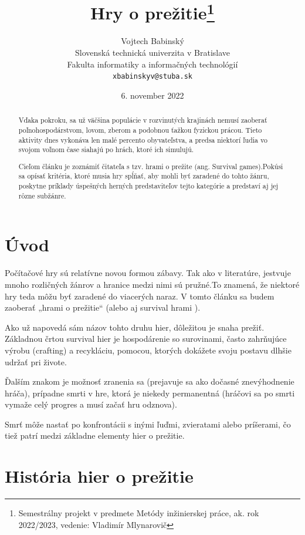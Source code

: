 \documentclass[10pt,oneoside,slovak,a4paper]{article}
\title{Hry o prežitie\thanks{Semestrálny projekt v predmete Metódy inžinierskej práce, ak. rok 2022/2023, vedenie: Vladimír Mlynarovič}} %
\author{Vojtech Babinský\\[2pt]
	{\small Slovenská technická univerzita v Bratislave}\\
	{\small Fakulta informatiky a informačných technológií}\\
	{\small \texttt{xbabinskyv@stuba.sk}}
	}
\date{\small 6. november 2022} %
\begin{document}
\maketitle

\begin{abstract}

Vďaka pokroku, sa už väčšina populácie v rozvinutých krajinách nemusí zaoberať poľnohospodárstvom, lovom, zberom a podobnou ťažkou fyzickou prácou. Tieto aktivity dnes vykonáva len malé percento obyvateľstva, a predsa niektorí ľudia vo svojom voľnom čase siahajú po hrách, ktoré ich simulujú.

Cieľom článku je zoznámiť čitateľa s tzv. hrami o prežite (ang. Survival games).Pokúsi sa opísať kritéria, ktoré musia hry spĺňať, aby mohli byť zaradené do tohto žánru, poskytne príklady  úspešných herných predstaviteľov tejto kategórie a predstaví aj jej rôzne subžánre. 
\end{abstract}


\newpage

\section{Úvod}
Počítačové hry sú relatívne novou formou zábavy. Tak ako v literatúre, jestvuje mnoho rozličných žánrov a hranice medzi nimi sú pružné.To znamená, že niektoré hry teda môžu byť zaradené do viacerých naraz. V tomto článku sa budem zaoberať „hrami o prežitie“ (alebo aj survival hrami ). 

Ako už napovedá sám názov tohto druhu hier, dôležitou je snaha prežiť. Základnou črtou survival hier je hospodárenie so surovinami, často zahrňujúce výrobu (crafting) a recykláciu, pomocou, ktorých dokážete svoju postavu dlhšie udržať pri živote. \cite{Pavlovic}

Ďalším znakom je možnosť zranenia sa (prejavuje sa ako dočasné znevýhodnenie hráča), prípadne smrti v hre, ktorá je niekedy permanentná (hráčovi sa po smrti vymaže celý progres a musí začať hru odznova). 

Smrť môže nastať po konfrontácii s inými ľuďmi, zvieratami alebo príšerami, čo tiež patrí medzi základne elementy hier o prežitie.\cite{Reid}

\section{História hier o prežitie }
\end{document}

